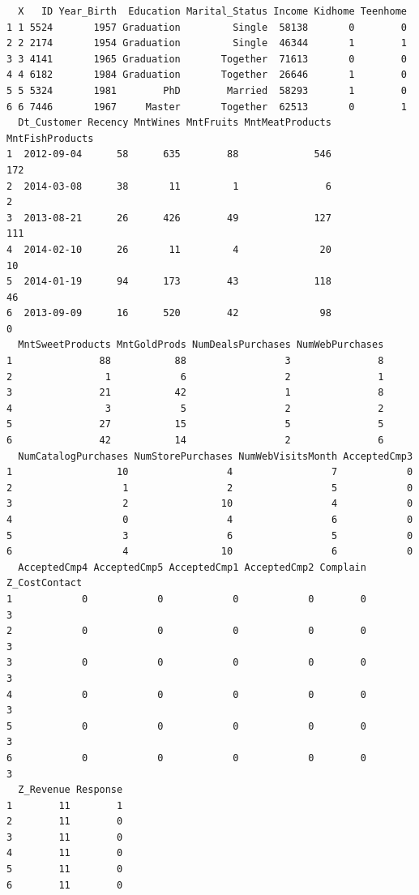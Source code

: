 \documentclass[
  a4paperpaper,
  DIV=11,
  numbers=noendperiod]{scrartcl}
\begin{document}
\begin{verbatim}
  X   ID Year_Birth  Education Marital_Status Income Kidhome Teenhome
1 1 5524       1957 Graduation         Single  58138       0        0
2 2 2174       1954 Graduation         Single  46344       1        1
3 3 4141       1965 Graduation       Together  71613       0        0
4 4 6182       1984 Graduation       Together  26646       1        0
5 5 5324       1981        PhD        Married  58293       1        0
6 6 7446       1967     Master       Together  62513       0        1
  Dt_Customer Recency MntWines MntFruits MntMeatProducts MntFishProducts
1  2012-09-04      58      635        88             546             172
2  2014-03-08      38       11         1               6               2
3  2013-08-21      26      426        49             127             111
4  2014-02-10      26       11         4              20              10
5  2014-01-19      94      173        43             118              46
6  2013-09-09      16      520        42              98               0
  MntSweetProducts MntGoldProds NumDealsPurchases NumWebPurchases
1               88           88                 3               8
2                1            6                 2               1
3               21           42                 1               8
4                3            5                 2               2
5               27           15                 5               5
6               42           14                 2               6
  NumCatalogPurchases NumStorePurchases NumWebVisitsMonth AcceptedCmp3
1                  10                 4                 7            0
2                   1                 2                 5            0
3                   2                10                 4            0
4                   0                 4                 6            0
5                   3                 6                 5            0
6                   4                10                 6            0
  AcceptedCmp4 AcceptedCmp5 AcceptedCmp1 AcceptedCmp2 Complain Z_CostContact
1            0            0            0            0        0             3
2            0            0            0            0        0             3
3            0            0            0            0        0             3
4            0            0            0            0        0             3
5            0            0            0            0        0             3
6            0            0            0            0        0             3
  Z_Revenue Response
1        11        1
2        11        0
3        11        0
4        11        0
5        11        0
6        11        0
\end{verbatim}
\end{document}
